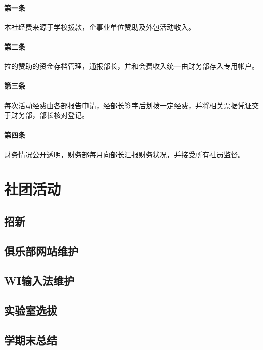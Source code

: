 \documentclass{club}
\begin{document}
\paragraph{第一条} 本社经费来源于学校拨款，企事业单位赞助及外包活动收入。
\paragraph{第二条} 拉的赞助的资金存档管理，通报部长，并和会费收入统一由财务部存入专用帐户。
\paragraph{第三条} 每次活动经费由各部报告申请，经部长签字后划拨一定经费，并将相关票据凭证交于财务部，部长核对登记。
\paragraph{第四条} 财务情况公开透明，财务部每月向部长汇报财务状况，并接受所有社员监督。

\section{社团活动}

\subsection{招新}

\subsection{俱乐部网站维护}

\subsection{WI输入法维护}

\subsection{实验室选拔}

\subsection{学期末总结}


\end{document}
